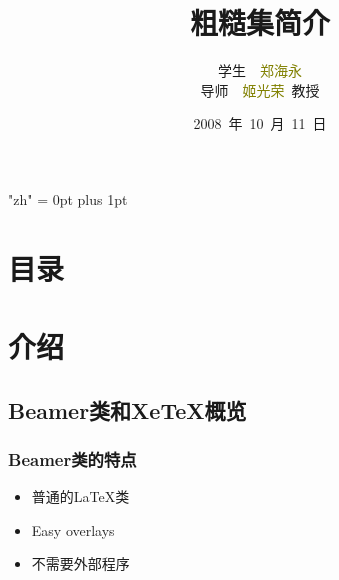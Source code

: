 \documentclass[notheorems,mathserif,table,compress]{beamer}  %
\begin{document}
\XeTeXlinebreaklocale "zh"         %
\XeTeXlinebreakskip = 0pt plus 1pt %
\title[粗糙集]{粗糙集简介}
\author[郑海永]{学生~~\textcolor{olive}{郑海永}\\
  \hspace{2.28em}导师~~\textcolor{olive}{姬光荣}~教授}
\institute[中国海洋大学]{\small\textcolor{violet}{中国海洋大学~~信息科学与工程学院}}
\date{2008~年~10~月~11~日}
\frame{ \titlepage }
\section*{目录}
\section{介绍}
\subsection{Beamer类和XeTeX概览} %
\begin{frame}
  \frametitle{Beamer类的特点}
  \begin{itemize}
  \item 普通的\LaTeX 类
  \item Easy overlays
  \item 不需要外部程序
  \end{itemize}
\end{frame}
\end{document}

